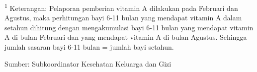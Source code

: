 {}

\vspace{2ex}
{\small
	\textsuperscript{1} Keterangan: Pelaporan pemberian vitamin A dilakukan pada Februari dan Agustus, maka perhitungan bayi 6-11 bulan yang mendapat vitamin A dalam setahun dihitung dengan mengakumulasi bayi 6-11 bulan yang mendapat vitamin A di bulan Februari dan yang mendapat vitamin A di bulan Agustus. Sehingga jumlah sasaran bayi 6-11 bulan = jumlah bayi setahun.
	
}
\vfill
Sumber: Subkoordinator Kesehatan Keluarga dan Gizi\par 

